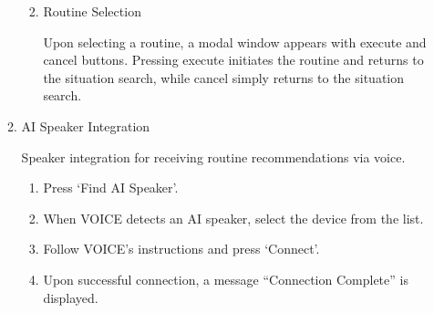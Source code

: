 \documentclass[conference]{IEEEtran}
\begin{document}
\begin{enumerate}[label=\arabic*]
\begin{enumerate}[label=\arabic*)]
\begin{enumerate}[label=\alph*)]
            \vspace{0.5em}

            \item Routine Selection\par
            \vspace{0.3em}
            Upon selecting a routine, a modal window appears with execute and cancel buttons. Pressing execute initiates the routine and returns to the situation search, while cancel simply returns to the situation search.
        \end{enumerate}

        \vspace{0.5em}

        \item AI Speaker Integration\par
        \vspace{0.3em}
        Speaker integration for receiving routine recommendations via voice.
        \vspace{0.3em}

        \begin{enumerate}[label=\alph*)]
            \item Press ‘Find AI Speaker’.

            \vspace{0.5em}

            \item When VOICE detects an AI speaker, select the device from the list.

            \vspace{0.5em}

            \item Follow VOICE's instructions and press ‘Connect’.

            \vspace{0.5em}

            \item Upon successful connection, a message “Connection Complete” is displayed. 
        \end{enumerate}
    \end{enumerate}
\end{enumerate}

\vspace{0.7em} %

\end{document}
